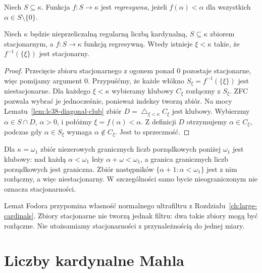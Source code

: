 \begin{definicja}
\label{def:lc38-regressive}
Niech $S\subseteq\kappa$.
Funkcja $f:S\to\kappa$ jest
\emph{regresywna}, jeżeli
$f(\alpha)<\alpha$
dla wszystkich $\alpha\in S\setminus\{0\}$.
\end{definicja}

\begin{twierdzenie}\label{thm:lc38-fodor}
Niech $\kappa$ będzie nieprzeliczalną
regularną liczbą kardynalną, $S\subseteq\kappa$
zbiorem stacjonarnym, a $f:S\to\kappa$
funkcją regresywną.
Wtedy istnieje $\xi<\kappa$
takie, że $f^{-1}(\{\xi\})$
jest stacjonarny.
\end{twierdzenie}
\begin{proof}
Przecięcie zbioru stacjonarnego
z ogonem ponad $0$ pozostaje
stacjonarne, więc pomijamy argument $0$.
Przypuśćmy, że każde włókno
$S_\xi=f^{-1}(\{\xi\})$
jest niestacjonarne.
Dla każdego $\xi<\kappa$
wybieramy klubowy $C_\xi$
rozłączny z $S_\xi$.
ZFC pozwala wybrać je jednocześnie,
ponieważ indeksy tworzą zbiór.
Na mocy Lematu~\ref{lem:lc38-diagonal-club}
zbiór $D=\mathop{\triangle}_{\xi<\kappa}C_\xi$
jest klubowy.
Wybierzmy $\alpha\in S\cap D$,
$\alpha>0$, i połóżmy
$\xi=f(\alpha)<\alpha$.
Z definicji $D$ otrzymujemy
$\alpha\in C_\xi$, podczas gdy
$\alpha\in S_\xi$ wymaga
$\alpha\notin C_\xi$.
Jest to sprzeczność.
\end{proof}

\begin{przyklad}
\label{ex:lc38-omega-one}
Dla $\kappa=\omega_1$ zbiór
niezerowych granicznych liczb
porządkowych poniżej $\omega_1$
jest klubowy: nad każdą
$\alpha<\omega_1$ leży
$\alpha+\omega<\omega_1$, a
granica granicznych liczb porządkowych
jest graniczna. Zbiór następników
$\{\alpha+1:\alpha<\omega_1\}$
jest z nim rozłączny,
a więc niestacjonarny.
W szczególności samo bycie
nieograniczonym nie oznacza
stacjonarności.
\end{przyklad}

\begin{uwaga}
\label{rem:lc38-fodor-normal}
Lemat Fodora przypomina własność
normalnego ultrafiltru z
Rozdziału~\ref{ch:large-cardinals}.
Zbiory stacjonarne nie tworzą
jednak filtru: dwa takie zbiory
mogą być rozłączne.
Nie utożsamiamy stacjonarności
z przynależnością do jednej miary.
\end{uwaga}

\section{Liczby kardynalne Mahla}

